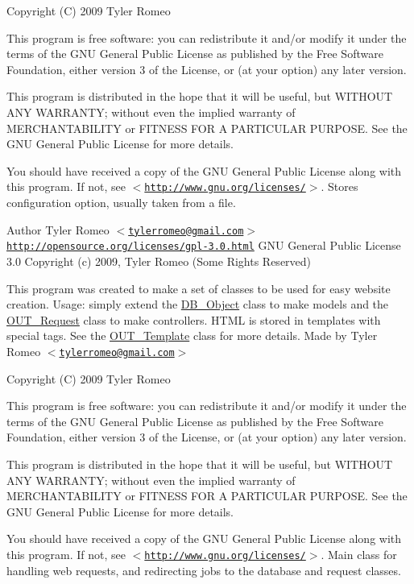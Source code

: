 Copyright (C) 2009 Tyler Romeo

This program is free software: you can redistribute it and/or modify it under the terms of the GNU General Public License as published by the Free Software Foundation, either version 3 of the License, or (at your option) any later version.

This program is distributed in the hope that it will be useful, but WITHOUT ANY WARRANTY; without even the implied warranty of MERCHANTABILITY or FITNESS FOR A PARTICULAR PURPOSE. See the GNU General Public License for more details.

You should have received a copy of the GNU General Public License along with this program. If not, see $<$\href{http://www.gnu.org/licenses/}{\tt http://www.gnu.org/licenses/}$>$. Stores configuration option, usually taken from a file.

\begin{DoxyAuthor}{Author}
Tyler Romeo $<$\href{mailto:tylerromeo@gmail.com}{\tt tylerromeo@gmail.com}$>$  \href{http://opensource.org/licenses/gpl-3.0.html}{\tt http://opensource.org/licenses/gpl-\/3.0.html} GNU General Public License 3.0  Copyright (c) 2009, Tyler Romeo (Some Rights Reserved)
\end{DoxyAuthor}
This program was created to make a set of classes to be used for easy website creation. Usage: simply extend the \hyperlink{classDB__Object}{DB\_\-Object} class to make models and the \hyperlink{classOUT__Request}{OUT\_\-Request} class to make controllers. HTML is stored in templates with special tags. See the \hyperlink{classOUT__Template}{OUT\_\-Template} class for more details. Made by Tyler Romeo $<$\href{mailto:tylerromeo@gmail.com}{\tt tylerromeo@gmail.com}$>$

Copyright (C) 2009 Tyler Romeo

This program is free software: you can redistribute it and/or modify it under the terms of the GNU General Public License as published by the Free Software Foundation, either version 3 of the License, or (at your option) any later version.

This program is distributed in the hope that it will be useful, but WITHOUT ANY WARRANTY; without even the implied warranty of MERCHANTABILITY or FITNESS FOR A PARTICULAR PURPOSE. See the GNU General Public License for more details.

You should have received a copy of the GNU General Public License along with this program. If not, see $<$\href{http://www.gnu.org/licenses/}{\tt http://www.gnu.org/licenses/}$>$. Main class for handling web requests, and redirecting jobs to the database and request classes.

